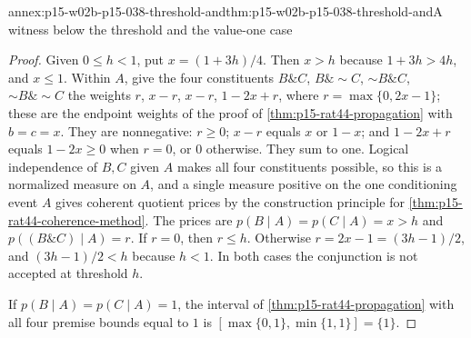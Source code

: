 \begin{annexitem}{annex:p15-w02b-p15-038-threshold-and}{thm:p15-w02b-p15-038-threshold-and}{A witness below the threshold and the value-one case}
\begin{proof}
Given \(0\leq h<1\), put \(x=(1+3h)/4\). Then \(x>h\) because
\(1+3h>4h\), and \(x\leq1\). Within \(A\), give the four constituents
\(B\mathbin{\&}C\), \(B\mathbin{\&}\sim C\), \(\sim B\mathbin{\&}C\),
\(\sim B\mathbin{\&}\sim C\) the weights \(r\), \(x-r\), \(x-r\),
\(1-2x+r\), where \(r=\max\{0,2x-1\}\); these are the endpoint weights
of the proof of \cref{thm:p15-rat44-propagation} with \(b=c=x\). They
are nonnegative: \(r\geq0\); \(x-r\) equals \(x\) or \(1-x\); and
\(1-2x+r\) equals \(1-2x\geq0\) when \(r=0\), or \(0\) otherwise. They
sum to one. Logical independence of \(B,C\) given \(A\) makes all four
constituents possible, so this is a normalized measure on \(A\), and a
single measure positive on the one conditioning event \(A\) gives
coherent quotient prices by the construction principle for
\cref{thm:p15-rat44-coherence-method}. The prices are
\(p(B\mid A)=p(C\mid A)=x>h\) and \(p((B\mathbin{\&}C)\mid A)=r\).
If \(r=0\), then \(r\leq h\). Otherwise
\(r=2x-1=(3h-1)/2\), and \((3h-1)/2<h\) because \(h<1\). In both cases
the conjunction is not accepted at threshold \(h\).

If \(p(B\mid A)=p(C\mid A)=1\), the interval of
\cref{thm:p15-rat44-propagation} with all four premise bounds equal to
\(1\) is \([\max\{0,1\},\min\{1,1\}]=\{1\}\).
\end{proof}
\end{annexitem}

